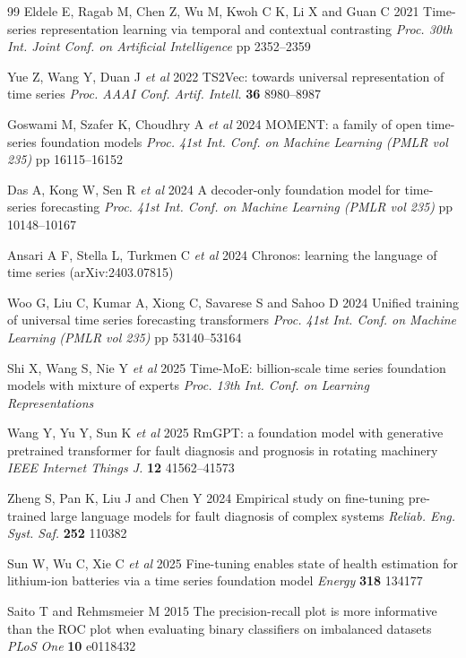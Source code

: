 \documentclass[12pt]{iopjournal}
\begin{document}
\begin{thebibliography}{99}
 Eldele E, Ragab M, Chen Z, Wu M, Kwoh C K, Li X and Guan C 2021 Time-series representation learning via temporal and contextual contrasting \textit{Proc. 30th Int. Joint Conf. on Artificial Intelligence} pp 2352--2359

 Yue Z, Wang Y, Duan J \textit{et al} 2022 TS2Vec: towards universal representation of time series \textit{Proc. AAAI Conf. Artif. Intell.} \textbf{36} 8980--8987

 Goswami M, Szafer K, Choudhry A \textit{et al} 2024 MOMENT: a family of open time-series foundation models \textit{Proc. 41st Int. Conf. on Machine Learning (PMLR vol 235)} pp 16115--16152

 Das A, Kong W, Sen R \textit{et al} 2024 A decoder-only foundation model for time-series forecasting \textit{Proc. 41st Int. Conf. on Machine Learning (PMLR vol 235)} pp 10148--10167

 Ansari A F, Stella L, Turkmen C \textit{et al} 2024 Chronos: learning the language of time series (arXiv:2403.07815)

 Woo G, Liu C, Kumar A, Xiong C, Savarese S and Sahoo D 2024 Unified training of universal time series forecasting transformers \textit{Proc. 41st Int. Conf. on Machine Learning (PMLR vol 235)} pp 53140--53164

 Shi X, Wang S, Nie Y \textit{et al} 2025 Time-MoE: billion-scale time series foundation models with mixture of experts \textit{Proc. 13th Int. Conf. on Learning Representations}

 Wang Y, Yu Y, Sun K \textit{et al} 2025 RmGPT: a foundation model with generative pretrained transformer for fault diagnosis and prognosis in rotating machinery \textit{IEEE Internet Things J.} \textbf{12} 41562--41573

 Zheng S, Pan K, Liu J and Chen Y 2024 Empirical study on fine-tuning pre-trained large language models for fault diagnosis of complex systems \textit{Reliab. Eng. Syst. Saf.} \textbf{252} 110382

 Sun W, Wu C, Xie C \textit{et al} 2025 Fine-tuning enables state of health estimation for lithium-ion batteries via a time series foundation model \textit{Energy} \textbf{318} 134177

 Saito T and Rehmsmeier M 2015 The precision-recall plot is more informative than the ROC plot when evaluating binary classifiers on imbalanced datasets \textit{PLoS One} \textbf{10} e0118432


\end{thebibliography}
\end{document}
